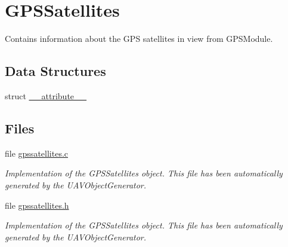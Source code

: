 \hypertarget{group___g_p_s_satellites}{\section{\-G\-P\-S\-Satellites}
\label{group___g_p_s_satellites}
}


\-Contains information about the \-G\-P\-S satellites in view from \-G\-P\-S\-Module.  


\subsection*{\-Data \-Structures}
\begin{DoxyCompactItemize}
\item 
struct \hyperlink{struct____attribute____}{\-\_\-\-\_\-attribute\-\_\-\-\_\-}
\end{DoxyCompactItemize}
\subsection*{\-Files}
\begin{DoxyCompactItemize}
\item 
file \hyperlink{gpssatellites_8c}{gpssatellites.\-c}
\begin{DoxyCompactList}\small\item\em \-Implementation of the \-G\-P\-S\-Satellites object. \-This file has been automatically generated by the \-U\-A\-V\-Object\-Generator. \end{DoxyCompactList}\item 
file \hyperlink{gpssatellites_8h}{gpssatellites.\-h}
\begin{DoxyCompactList}\small\item\em \-Implementation of the \-G\-P\-S\-Satellites object. \-This file has been automatically generated by the \-U\-A\-V\-Object\-Generator. \end{DoxyCompactList}\end{DoxyCompactItemize}
